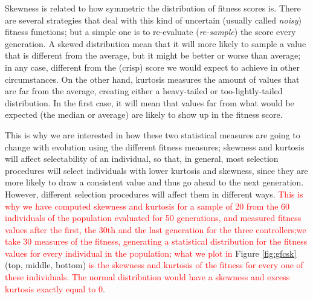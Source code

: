 \documentclass[10pt,journal,compsoc]{IEEEtran}
\begin{document}
Skewness is related to how symmetric the distribution of fitness
scores is. There are several strategies that deal with this kind of
uncertain (usually called {\em noisy}) fitness functions; but a simple
one is to re-evaluate ({\em re-sample}) the score every generation. A
skewed distribution mean that it will more likely to sample a value
that is different from the average, but it might be better or worse
than average; in any case, different from the (crisp) score we would expect to
achieve in other circumstances. On the other hand, kurtosis measures
the amount of values that are far from the average, creating either a
heavy-tailed or too-lightly-tailed distribution. In the first case, it
will mean that values far from what would be expected (the median or average) are likely to
show up in the fitness score.

This is why we are interested in how these two statistical measures
are going to change with evolution using the different fitness measures; skewness and kurtosis will  affect
selectability of an individual, so that, in general, most selection procedures will select
individuals with lower kurtosis and skewness, since they are more
likely to draw a consistent value and thus go ahead to the next
generation. However, different selection procedures will affect them
in different ways.  \textcolor{red}{This is why we have computed
  skewness and kurtosis for a sample of 20 from the 60 individuals of
  the population evaluated for 50 generations, and measured fitness
  values after the first, the 30th and the last generation for the
  three controllers;}\textcolor{red}{we take 30 measures of the
  fitness, generating a statistical distribution for the fitness
  values for every individual in the population; what we plot in}
Figure \ref{fig:gfcsk} (top, middle, bottom) \textcolor{red}{is the
  skewness and kurtosis of the fitness for every one of these
  individuals. The normal distribution would have a skewness and
  excess kurtosis exactly equal to 0}.
\end{document}
